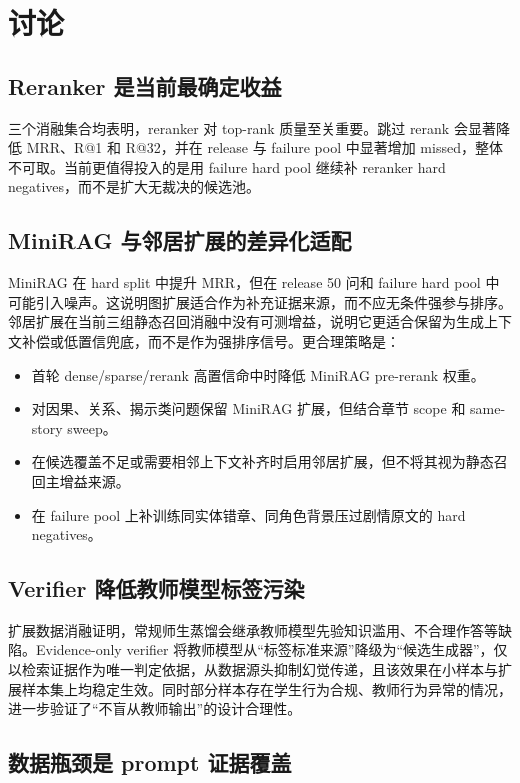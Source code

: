 \documentclass[UTF8,a4paper,12pt]{ctexart}
\begin{document}
\section{讨论}

\subsection{Reranker 是当前最确定收益}

三个消融集合均表明，reranker 对 top-rank 质量至关重要。跳过 rerank 会显著降低 MRR、R@1 和 R@32，并在 release 与 failure pool 中显著增加 missed，整体不可取。当前更值得投入的是用 failure hard pool 继续补 reranker hard negatives，而不是扩大无裁决的候选池。

\subsection{MiniRAG 与邻居扩展的差异化适配}

MiniRAG 在 hard split 中提升 MRR，但在 release 50 问和 failure hard pool 中可能引入噪声。这说明图扩展适合作为补充证据来源，而不应无条件强参与排序。邻居扩展在当前三组静态召回消融中没有可测增益，说明它更适合保留为生成上下文补偿或低置信兜底，而不是作为强排序信号。更合理策略是：
\begin{itemize}
  \item 首轮 dense/sparse/rerank 高置信命中时降低 MiniRAG pre-rerank 权重。
  \item 对因果、关系、揭示类问题保留 MiniRAG 扩展，但结合章节 scope 和 same-story sweep。
  \item 在候选覆盖不足或需要相邻上下文补齐时启用邻居扩展，但不将其视为静态召回主增益来源。
  \item 在 failure pool 上补训练同实体错章、同角色背景压过剧情原文的 hard negatives。
\end{itemize}

\subsection{Verifier 降低教师模型标签污染}

扩展数据消融证明，常规师生蒸馏会继承教师模型先验知识滥用、不合理作答等缺陷。Evidence-only verifier 将教师模型从“标签标准来源”降级为“候选生成器”，仅以检索证据作为唯一判定依据，从数据源头抑制幻觉传递，且该效果在小样本与扩展样本集上均稳定生效。同时部分样本存在学生行为合规、教师行为异常的情况，进一步验证了“不盲从教师输出”的设计合理性。

\subsection{数据瓶颈是 prompt 证据覆盖}
\end{document}
